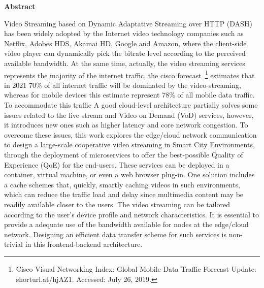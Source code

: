 \begin{center}
	{\bf Abstract}
\end{center}

Video Streaming based on Dynamic Adaptative Streaming over HTTP (DASH) has been widely adopted by the Internet video technology companies such as Netflix, Adobes HDS, Akamai HD, Google and Amazon, where the client-side video player can dynamically pick the bitrate level according to the perceived available bandwidth. 
At the same time, actually, the video streaming services represents the majority of the internet traffic, the cisco forecast~\footnote{Cisco Visual Networking Index: Global Mobile Data Traffic Forecast Update: shorturl.at/hjAZ1. Accessed: July 26, 2019.} estimates that in 2021 70\% of all internet traffic will be dominated by the video-streaming, whereas for mobile devices this estimate represent 78\% of all mobile data traffic. To accommodate this traffic %
A good cloud-level architecture partially solves some issues related to the live stream and Video on Demand (VoD) services, however, it introduces new ones such as higher latency and core network congestion. 
To overcome these issues, this work explores the edge/cloud network communication to design a large-scale cooperative video streaming in Smart City Environments, through the deployment of microservices to offer the best-possible Quality of Experience (QoE) for the end-users. These services can be deployed in a container, virtual machine, or even a web browser plug-in. One solution includes a cache schemes that, quickly, smartly caching videos in such environments, which can reduce the traffic load and delay since multimedia content may be readily available closer to the users. The video streaming can be tailored according to the user's device profile and network characteristics. It is essential to provide a adequate use of the bandwidth available for nodes at the edge/cloud network.%
Designing an efficient data transfer scheme for such services is non-trivial in this frontend-backend architecture.
